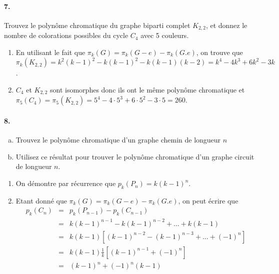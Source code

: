 \paragraph{7. } Trouvez le polynôme chromatique du graphe biparti complet $K_{2,2}$, et donnez le nombre de colorations possibles du cycle $C_4$ avec 5 couleurs.
\begin{solution}
  \begin{enumerate}
  \item En utilisant le fait que $\pi_k(G) = \pi_k(G-e) - \pi_k(G.e)$, on trouve que $\pi_k(K_{2,2}) = k^2(k-1)^2 - k (k-1)^2 - k(k-1)(k-2) = k^4-4k^3+6k^2-3k$.
  \item $C_4$ et $K_{2,2}$ sont isomorphes donc ils ont le même polynôme chromatique et $\pi_5(C_4) = \pi_5(K_{2,2}) = 5^4 - 4\cdot 5^3 + 6\cdot 5^2 - 3\cdot 5 = 260$.
\end{enumerate}
\end{solution}

\paragraph{8. }
\begin{enumerate}[(a)]
  \item Trouvez le polynôme chromatique d'un graphe chemin de longueur $n$
  \item Utilisez ce résultat pour trouver le polynôme chromatique d'un graphe circuit de longueur $n$.
\end{enumerate}
\begin{solution}
  \begin{enumerate}
  \item On démontre par récurrence que $p_k(P_n) = k(k-1)^n$.
  \item Etant donné que $\pi_k(G) = \pi_k(G-e) - \pi_k(G.e)$, on peut écrire que
           \begin{eqnarray*}
           p_k(C_n) &=& p_k(P_{n-1}) - p_k(C_{n-1})\\
           		    &=& k(k-1)^{n-1} - k(k-1)^{n-2} + ... + k(k-1)\\
		             &=& k(k-1) [(k-1)^{n-2} - (k-1)^{n-3} + ... + (-1)^n]\\
		             &=& k(k-1)\frac{1}{k}[(k-1)^{n-1}+(-1)^n]\\
		             &=& (k-1)^n + (-1)^n (k-1)
	   \end{eqnarray*}             
\end{enumerate}
\end{solution}

